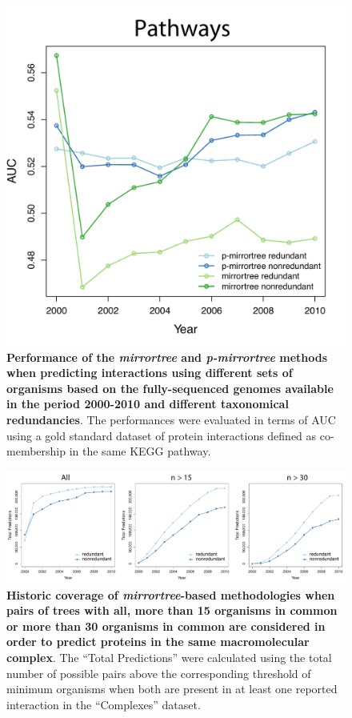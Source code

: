 \begin{figure}[htbp]
\centering
\includegraphics[keepaspectratio,width=\textwidth,height=0.75\textheight]{../figures/mthistoric_pthwys.pdf}
\caption{\textbf{Performance of the \emph{mirrortree} and \emph{p-mirrortree} methods when predicting interactions using different sets of organisms based on the fully-sequenced genomes available in the period 2000-2010 and different taxonomical redundancies}. The performances were evaluated in terms of AUC using a gold standard dataset of protein interactions defined as co-membership in the same KEGG pathway.}
\label{mthistoric_pthwys.pdf}
\end{figure}

\begin{figure}[htbp]
\centering
\includegraphics[keepaspectratio,width=\textwidth,height=0.75\textheight]{../figures/mtCoverages.pdf}
\caption{\textbf{Historic coverage of \emph{mirrortree}-based methodologies when pairs of trees with all, more than 15 organisms in common or more than 30 organisms in common are considered in order to predict proteins in the same macromolecular complex}. The ``Total Predictions'' were calculated using the total number of possible pairs above the corresponding threshold of minimum organisms when both are present in at least one reported interaction in the ``Complexes'' dataset.}
\label{mtcoverages.pdf}
\end{figure}

